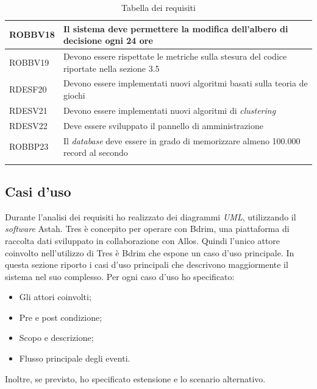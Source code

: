 \begin{longtable}{|l|p{7cm}|}
ROBBV18	&	Il sistema deve permettere la modifica dell'albero di decisione ogni 24 ore	\\\hline
ROBBV19	&	Devono essere rispettate le metriche sulla stesura del codice riportate nella sezione 3.5 \\\hline
RDESF20	&	Devono essere implementati nuovi algoritmi basati sulla teoria de giochi	\\\hline
RDESV21	&	Devono essere implementati nuovi algoritmi di \emph{clustering}	\\\hline
RDESV22	&	Deve essere sviluppato il pannello di amministrazione	\\\hline
ROBBP23	&	Il \emph{database} deve essere in grado di memorizzare almeno 100.000 record al secondo	\\\hline
\caption{Tabella dei requisiti}
\end{longtable}
\subsection{Casi d'uso}
Durante l'analisi dei requisiti ho realizzato dei diagrammi \emph{UML}, utilizzando il \emph{software} Astah. Tres è concepito per operare con Bdrim, una piattaforma di raccolta dati sviluppato in collaborazione con Allos. Quindi l'unico attore coinvolto nell'utilizzo di Tres è Bdrim che espone un caso d'uso principale. In questa sezione riporto i casi d'uso principali che descrivono maggiormente il sistema nel suo complesso. Per ogni caso d'uso ho specificato: 
\begin{itemize}
\item Gli attori coinvolti;
\item Pre e post condizione;
\item Scopo e descrizione;
\item Flusso principale degli eventi.
\end{itemize}
Inoltre, se previsto, ho specificato estensione e lo scenario alternativo.
\newpage
